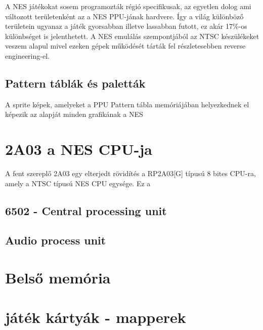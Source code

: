 	A NES játékokat sosem programozták régió specifikusak, az egyetlen dolog ami változott területenként az a NES PPU-jának hardvere. Így a világ különböző területein ugyanaz a játék gyorsabban illetve lassabban futott, ez akár 17\%-os különbséget is jelenthetett. A NES emulálás szempontjából az NTSC készülékeket veszem alapul mivel ezeken gépek működését tárták fel részletesebben reverse engineering-el.
	
	\subsection{Pattern táblák és paletták}
	A sprite képek, amelyeket a PPU Pattern tábla memóriájában helyezkednek el képezik az alapját minden grafikának a NES      
 
\section{2A03 a NES CPU-ja}

A fent szereplő 2A03 egy elterjedt rövidítés a RP2A03[G] típusú 8 bites CPU-ra, amely a NTSC típusú NES CPU egysége. Ez a  

	\subsection{6502 - Central processing unit}

	\subsection{Audio process unit}

\section{Belső memória}

\section{játék kártyák - mapperek}
